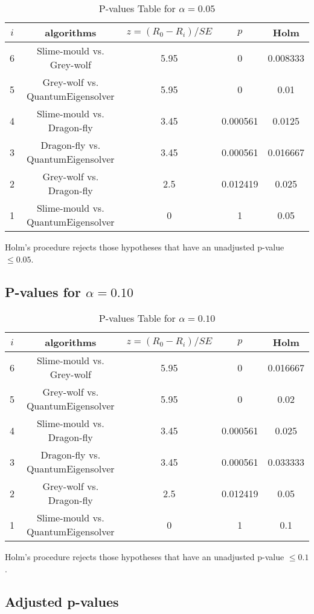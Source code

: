 \documentclass[a4paper,10pt]{article}
\begin{document}
\begin{landscape}
\begin{table}[!htp]
\centering\scriptsize
\begin{tabular}{ccccc}
$i$&algorithms&$z=(R_0 - R_i)/SE$&$p$&Holm\\
\hline6&Slime-mould vs. Grey-wolf&5.95&0&0.008333\\
5&Grey-wolf vs. QuantumEigensolver&5.95&0&0.01\\
4&Slime-mould vs. Dragon-fly&3.45&0.000561&0.0125\\
3&Dragon-fly vs. QuantumEigensolver&3.45&0.000561&0.016667\\
2&Grey-wolf vs. Dragon-fly&2.5&0.012419&0.025\\
1&Slime-mould vs. QuantumEigensolver&0&1&0.05\\
\hline
\end{tabular}
\caption{P-values Table for $\alpha=0.05$}
\end{table}Holm's procedure rejects those hypotheses that have an unadjusted p-value $\le0.05$.

\pagebreak

\subsection{P-values for $\alpha=0.10$}

\begin{table}[!htp]
\centering\scriptsize
\begin{tabular}{ccccc}
$i$&algorithms&$z=(R_0 - R_i)/SE$&$p$&Holm\\
\hline6&Slime-mould vs. Grey-wolf&5.95&0&0.016667\\
5&Grey-wolf vs. QuantumEigensolver&5.95&0&0.02\\
4&Slime-mould vs. Dragon-fly&3.45&0.000561&0.025\\
3&Dragon-fly vs. QuantumEigensolver&3.45&0.000561&0.033333\\
2&Grey-wolf vs. Dragon-fly&2.5&0.012419&0.05\\
1&Slime-mould vs. QuantumEigensolver&0&1&0.1\\
\hline
\end{tabular}
\caption{P-values Table for $\alpha=0.10$}
\end{table}Holm's procedure rejects those hypotheses that have an unadjusted p-value $\le0.1$.

\pagebreak

\subsection{Adjusted p-values}


\end{landscape}
\end{document}

